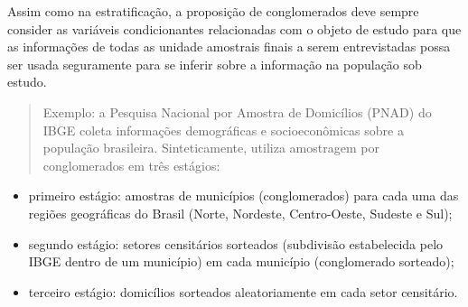 \documentclass[
]{book}
\providecommand{\tightlist}{%
  \setlength{\itemsep}{0pt}\setlength{\parskip}{0pt}}
\begin{document}
\hfill\break

Assim como na estratificação, a proposição de conglomerados deve sempre consider as variáveis condicionantes relacionadas com o objeto de estudo para que as informações de todas as unidade amostrais finais a serem entrevistadas possa ser usada seguramente para se inferir sobre a informação na população sob estudo.

\hfill\break

\begin{quote}
Exemplo: a Pesquisa Nacional por Amostra de Domicílios (PNAD) do IBGE coleta informações demográficas e socioeconômicas sobre a população brasileira. Sinteticamente, utiliza amostragem por conglomerados em três estágios:
\end{quote}

\hfill\break

\begin{itemize}
\tightlist
\item
  primeiro estágio: amostras de municípios (conglomerados) para cada uma das regiões geográficas do Brasil (Norte, Nordeste, Centro-Oeste, Sudeste e Sul);\\
\item
  segundo estágio: setores censitários sorteados (subdivisão estabelecida pelo IBGE dentro de um município) em cada município (conglomerado sorteado);\\
\item
  terceiro estágio: domicílios sorteados aleatoriamente em cada setor censitário.
\end{itemize}

\hfill\break
\end{document}
